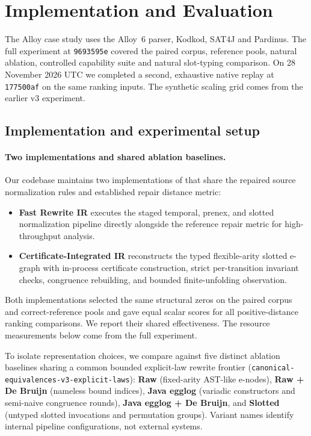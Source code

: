 \section{Implementation and Evaluation}
\label{sec:evaluation}

The Alloy case study uses the Alloy~6 parser, Kodkod, SAT4J and Pardinus.
The full experiment at \texttt{9693595e} covered the paired corpus, reference
pools, natural ablation, controlled capability suite and natural slot-typing
comparison. On 28 November 2026 UTC we completed a second, exhaustive native
replay at \texttt{177500af} on the same ranking inputs. The synthetic scaling
grid comes from the earlier v3 experiment.

\subsection{Implementation and experimental setup}
\label{sec:eval-setup}

\paragraph{Two \CanDis{} implementations and shared ablation baselines.}
Our codebase maintains two implementations of \CanDis{} that share the repaired
source normalization rules and established repair distance metric:
\begin{itemize}
\item \textbf{Fast Rewrite IR} executes the staged temporal, prenex, and
  slotted normalization pipeline directly alongside the reference repair metric
  for high-throughput analysis.
\item \textbf{Certificate-Integrated IR} reconstructs the typed flexible-arity
  slotted e-graph with in-process certificate construction, strict
  per-transition invariant checks, congruence rebuilding, and bounded
  finite-unfolding observation.
\end{itemize}
Both implementations selected the same structural zeros on the paired
corpus and correct-reference pools and gave equal scalar scores for all
\replayPairs{} positive-distance ranking comparisons. We report their shared
effectiveness. The resource measurements below come from the full experiment.

To isolate representation choices, we compare \CanDis{} against five distinct
ablation baselines sharing a common bounded explicit-law rewrite frontier
(\texttt{canonical-equivalences-v3-explicit-laws}): \textbf{Raw} (fixed-arity
AST-like e-nodes), \textbf{Raw + De Bruijn} (nameless bound indices),
\textbf{Java egglog} (variadic constructors and semi-naive congruence rounds),
\textbf{Java egglog + De Bruijn}, and \textbf{Slotted} (untyped slotted
invocations and permutation groups). Variant names identify internal pipeline
configurations, not external systems.

